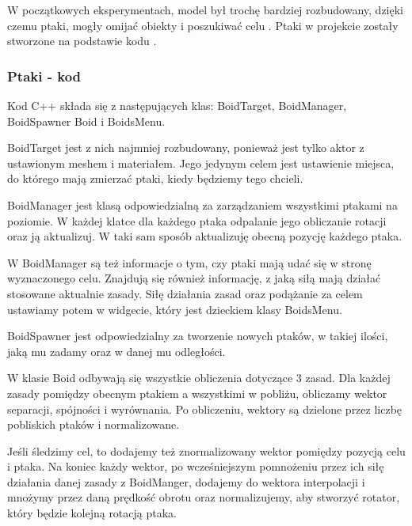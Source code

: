 \documentclass[a4paper,12pt,reqno]{article}
\begin{document}
W początkowych eksperymentach, model był trochę bardziej rozbudowany, dzięki czemu ptaki, mogły omijać obiekty i poszukiwać celu \cite{boids_reynolds}. Ptaki w projekcie zostały stworzone na podstawie kodu \cite{code_boids}.

\subsubsection{Ptaki - kod}

Kod C++ składa się z następujących klas: BoidTarget, BoidManager, BoidSpawner Boid i BoidsMenu.

BoidTarget jest z nich najmniej rozbudowany, ponieważ jest tylko aktor z ustawionym meshem i materiałem. Jego jedynym celem jest ustawienie miejsca, do którego mają zmierzać ptaki, kiedy będziemy tego chcieli.

BoidManager jest klasą odpowiedzialną za zarządzaniem wszystkimi ptakami na poziomie. W każdej klatce dla każdego ptaka odpalanie jego obliczanie rotacji oraz ją aktualizuj. W taki sam sposób aktualizuję obecną pozycję każdego ptaka.



W BoidManager są też informacje o tym, czy ptaki mają udać się w stronę wyznaczonego celu. Znajdują się również informację, z jaką siłą mają działać stosowane aktualnie zasady. Siłę działania zasad oraz podążanie za celem ustawiamy potem w widgecie, który jest dzieckiem klasy BoidsMenu.

BoidSpawner jest odpowiedzialny za tworzenie nowych ptaków, w takiej ilości, jaką mu zadamy oraz w danej mu odległości.

W klasie Boid odbywają się wszystkie obliczenia dotyczące 3 zasad. Dla każdej zasady pomiędzy obecnym ptakiem a wszystkimi w pobliżu, obliczamy wektor separacji, spójności i wyrównania. Po obliczeniu, wektory są dzielone przez liczbę pobliskich ptaków i normalizowane.



Jeśli śledzimy cel, to dodajemy też znormalizowany wektor pomiędzy pozycją celu i ptaka. Na koniec każdy wektor, po wcześniejszym pomnożeniu przez ich siłę działania danej zasady z BoidManger, dodajemy do wektora interpolacji i mnożymy przez daną prędkość obrotu oraz normalizujemy, aby stworzyć rotator, który będzie kolejną rotacją ptaka.
\end{document}
